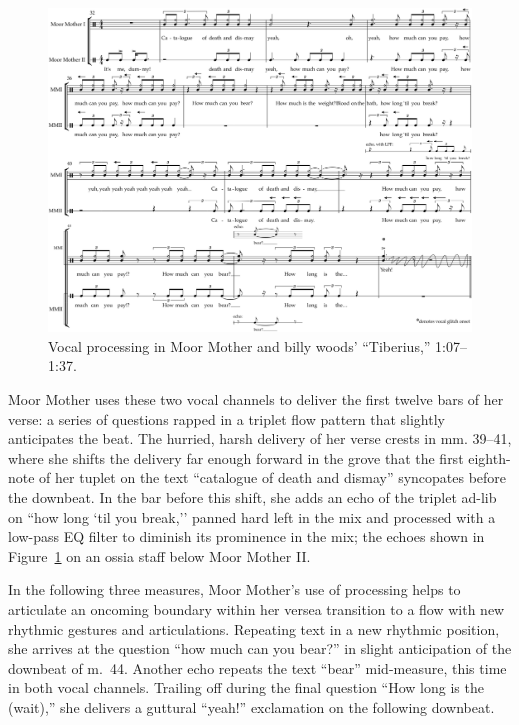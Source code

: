 \begin{figure}[!p]
    \centering
    \includegraphics[width=\textwidth]{images/figures/chp 03/107136tiberiusprocessing.pdf}
    \caption{Vocal processing in Moor Mother and billy woods' ``Tiberius,'' 1:07--1:37.}
    \label{fig:moormotherprocess}
\end{figure}

Moor Mother uses these two vocal channels to deliver the first twelve bars of her verse: a series
of questions rapped in a triplet flow pattern that slightly anticipates the beat. The hurried, 
harsh delivery of her verse crests in mm. 39--41, where she shifts the delivery far enough forward
in the grove that the first eighth-note of her tuplet on the text ``catalogue of death and dismay''
syncopates before the downbeat. In the bar before this shift, she adds an echo of the triplet ad-lib
on ``how long `til you break,'' panned hard left in the mix and processed with a low-pass EQ filter
to diminish its prominence in the mix; the echoes shown in Figure~\ref{fig:moormotherprocess} on
an ossia staff below Moor Mother II.

In the following three measures, Moor Mother's use of processing helps to articulate an oncoming 
boundary within her verse\textemdash a transition to a flow with new rhythmic gestures and articulations.
Repeating text in a new rhythmic position, she arrives at the question ``how much can you bear?'' 
in slight anticipation of the downbeat of m.~44. Another echo repeats the text ``bear'' mid-measure,
this time in both vocal channels. Trailing off during the final question ``How long is the (wait),''
she delivers a guttural ``yeah!'' exclamation on the following downbeat.

